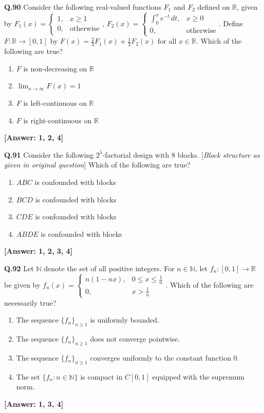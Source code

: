\documentclass[12pt,a4paper]{article}
\newcommand{\ans}[1]{\quad\textcolor{anscolor}{\textbf{[Answer: #1]}}}
\begin{document}
\textbf{Q.90} Consider the following real-valued functions $F_1$ and $F_2$ defined on $\mathbb{R}$, given by $F_1(x)=\begin{cases}1,&x\ge1\\0,&\text{otherwise}\end{cases}$, $F_2(x)=\begin{cases}\int_0^xe^{-t}\,dt,&x\ge0\\0,&\text{otherwise}\end{cases}$. Define $F:\mathbb{R}\to[0,1]$ by $F(x)=\tfrac{2}{3}F_1(x)+\tfrac{1}{3}F_2(x)$ for all $x\in\mathbb{R}$. Which of the following are true?
\begin{enumerate}[label=\arabic*.]
\item $F$ is non-decreasing on $\mathbb{R}$ \item $\lim_{x\to\infty}F(x)=1$
\item $F$ is left-continuous on $\mathbb{R}$ \item $F$ is right-continuous on $\mathbb{R}$
\end{enumerate}\ans{1, 2, 4}

\textbf{Q.91} Consider the following $2^5$-factorial design with 8 blocks. [\textit{Block structure as given in original question}] Which of the following are true?
\begin{enumerate}[label=\arabic*.]
\item $ABC$ is confounded with blocks \item $BCD$ is confounded with blocks
\item $CDE$ is confounded with blocks \item $ABDE$ is confounded with blocks
\end{enumerate}\ans{1, 2, 3, 4}

\textbf{Q.92} Let $\mathbb{N}$ denote the set of all positive integers. For $n\in\mathbb{N}$, let $f_n:[0,1]\to\mathbb{R}$ be given by $f_n(x)=\begin{cases}n(1-nx),&0\le x\le\tfrac{1}{n}\\0,&x>\tfrac{1}{n}\end{cases}$. Which of the following are necessarily true?
\begin{enumerate}[label=\arabic*.]
\item The sequence $\{f_n\}_{n\ge1}$ is uniformly bounded.
\item The sequence $\{f_n\}_{n\ge1}$ does not converge pointwise.
\item The sequence $\{f_n\}_{n\ge1}$ converges uniformly to the constant function 0.
\item The set $\{f_n:n\in\mathbb{N}\}$ is compact in $C[0,1]$ equipped with the supremum norm.
\end{enumerate}\ans{1, 3, 4}
\end{document}
